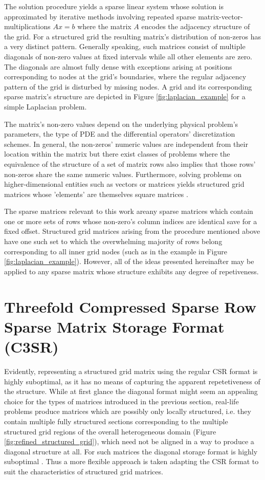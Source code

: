 \documentclass{article}
\begin{document}
    The solution procedure yields a sparse linear system whose solution is approximated by iterative methods involving repeated sparse matrix-vector-multiplications $Ax = b$ where the matrix $A$ encodes the adjacency structure of the grid. For a structured grid the resulting matrix's distribution of non-zeros has a very distinct pattern. Generally speaking, such matrices consist of multiple diagonals of non-zero values at fixed intervals while all other elements are zero. The diagonals are almost fully dense with exceptions arising at positions corresponding to nodes at the grid's boundaries, where the regular adjacency pattern of the grid is disturbed by missing nodes. A grid and its corresponding sparse matrix's structure are depicted in Figure \ref{fig:laplacian_example} for a simple Laplacian problem.

    The matrix's non-zero values depend on the underlying physical problem's parameters, the type of PDE and the differential operators' discretization schemes. In general, the non-zeros' numeric values are independent from their location within the matrix but there exist classes of problems where the equivalence of the structure of a set of matrix rows also implies that those rows' non-zeros share the same numeric values. Furthermore, solving problems on higher-dimensional entities such as vectors or matrices yields structured grid matrices whose 'elements' are themselves square matrices \cite{Godwin2013}.

    The sparse matrices relevant to this work areany sparse matrices which contain one or more sets of rows whose non-zero's column indices are identical save for a fixed offset. Structured grid matrices arising from the procedure mentioned above have one such set to which the overwhelming majority of rows belong corresponding to all inner grid nodes (such as in the example in Figure \ref{fig:laplacian_example}). However, all of the ideas presented hereinafter may be applied to any sparse matrix whose structure exhibits any degree of repetiveness.

\section{Threefold Compressed Sparse Row Sparse Matrix Storage Format (C3SR)}

  Evidently, representing a structured grid matrix using the regular CSR format is highly suboptimal, as it has no means of capturing the apparent repetetiveness of the structure. While at first glance the diagonal format might seem an appealing choice for the types of matrices introduced in the previous section, real-life problems produce matrices which are possibly only locally structured, i.e. they contain multiple fully structured sections corresponding to the multiple structured grid regions of the overall heterogeneous domain (Figure \ref{fig:refined_structured_grid}), which need not be aligned in a way to produce a diagonal structure at all. For such matrices the diagonal storage format is highly suboptimal \cite{Bell2011}. Thus a more flexible approach is taken adapting the CSR format to suit the characteristics of structured grid matrices.
\end{document}
